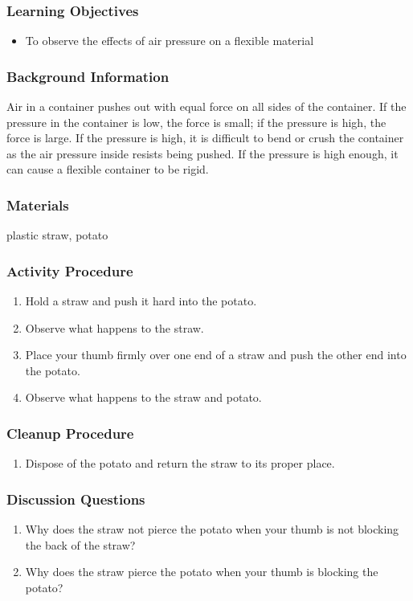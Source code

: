 \subsubsection*{Learning Objectives}
\begin{itemize}
\item{To observe the effects of air pressure on a flexible material}
\end{itemize}

\subsubsection*{Background Information}
Air in a container pushes out with equal force on all sides of the container. If the pressure in the container is low, the force is small; if the pressure is high, the force is large. If the pressure is high, it is difficult to bend or crush the container as the air pressure inside resists being pushed. If the pressure is high enough, it can cause a flexible container to be rigid.

\subsubsection*{Materials}
plastic straw, potato

\subsubsection*{Activity Procedure}
\begin{enumerate}
\item{Hold a straw and push it hard into the potato.}
\item{Observe what happens to the straw.}
\item{Place your thumb firmly over one end of a straw and push the other end into the potato.}
\item{Observe what happens to the straw and potato.}
\end{enumerate}

\subsubsection*{Cleanup Procedure}
\begin{enumerate}
\item{Dispose of the potato and return the straw to its proper place.}
\end{enumerate}

\subsubsection*{Discussion Questions}
\begin{enumerate}
\item{Why does the straw not pierce the potato when your thumb is not blocking the back of the straw?}
\item{Why does the straw pierce the potato when your thumb is blocking the potato?}
\end{enumerate}

